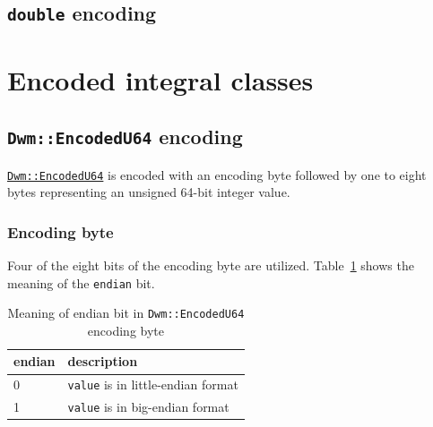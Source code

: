 \subsection{\texttt{double} encoding}
\noindent
{}

\section{Encoded integral classes}

\subsection{\texttt{Dwm::EncodedU64} encoding}\label{encoding:DwmEncodedU64}
\hyperref[class:EncodedU64]{\texttt{Dwm::EncodedU64}} is encoded with
an encoding byte followed by one to eight bytes representing an
unsigned 64-bit integer value.


\subsubsection{Encoding byte}


Four of the eight bits of the encoding byte are utilized.
Table~\ref{table:EncodedU64EndianBit} shows the meaning of the
\texttt{endian} bit.

\begin{table}[H]
\begin{center}
\begin{tabular}{ll}
  \textbf{endian} & \textbf{description} \\ \hline
  0 & \texttt{value} is in little-endian format \\ \hline
  1 & \texttt{value} is in big-endian format \\
\end{tabular}
\caption{Meaning of endian bit in \texttt{Dwm::EncodedU64} encoding byte}
\label{table:EncodedU64EndianBit}
\end{center}
\end{table}

